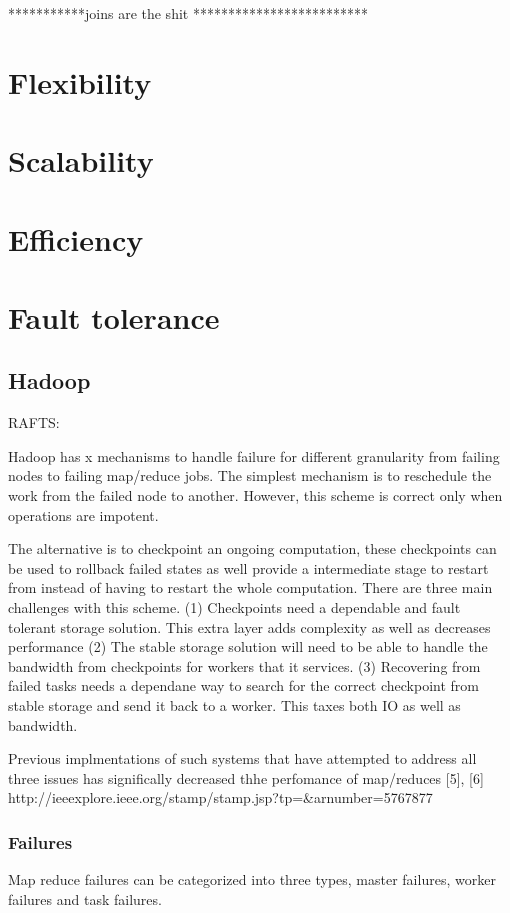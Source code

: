 \documentclass[10pt,twocolumn]{IEEEtran11}
\begin{document}
***********joins are the shit *************************


\section{Flexibility}
 
\section{Scalability}

\section{Efficiency}

\section{Fault tolerance}


\subsection{Hadoop}
RAFTS:

    Hadoop has x mechanisms to handle failure for different granularity from failing nodes to failing map/reduce jobs.
The simplest mechanism is to reschedule the work from the failed node to another.  However, this scheme is correct only when operations are impotent.  
\par
The alternative is to checkpoint an ongoing computation, these checkpoints can be used to rollback failed states as well provide a intermediate stage to restart from instead of having to restart the whole computation.  There are three main challenges with this scheme.
(1) Checkpoints need a dependable and fault tolerant storage solution.  This extra layer adds complexity as well as decreases performance
(2) The stable storage solution will need to be able to handle the bandwidth from checkpoints for workers that it services.
(3) Recovering from failed tasks needs a dependane way to search for the correct checkpoint from stable storage and
send it back to a worker.  This taxes both IO as well as bandwidth.
\par
Previous implmentations of such systems that have attempted to address all three issues has significally decreased thhe perfomance of map/reduces [5], [6] http://ieeexplore.ieee.org/stamp/stamp.jsp?tp=&arnumber=5767877

\subsubsection{Failures}
Map reduce failures can be categorized into three types, master failures, worker failures and task failures.
\end{document}
